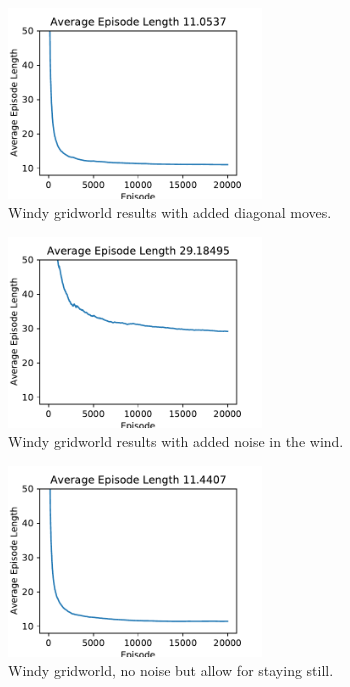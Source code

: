 \documentclass{article}
\begin{document}
\begin{figure}
	\includegraphics[width=0.6\textwidth]{kings}
	\centering
	\caption{\label{fig:kings} Windy gridworld results with added diagonal moves.}
\end{figure}

\begin{figure}
	\includegraphics[width=0.6\textwidth]{kings_stochastic}
	\centering
	\caption{\label{fig:kings_stochastic} Windy gridworld results with added noise in the wind. }
\end{figure}

\begin{figure}
	\includegraphics[width=0.6\textwidth]{kings_stationary}
	\centering
	\caption{\label{fig:kings_stationary} Windy gridworld, no noise but allow for staying still.}
\end{figure}
\end{document}
